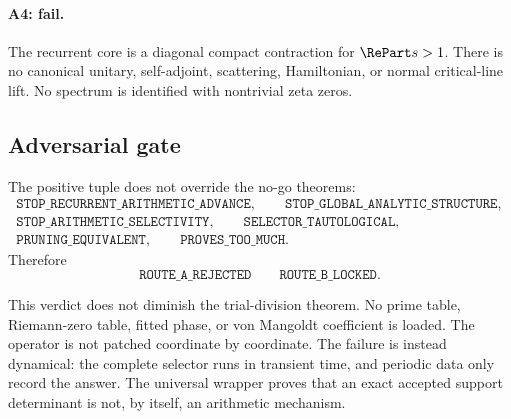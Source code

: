 \paragraph{A4: fail.}
The recurrent core is a diagonal compact contraction for $\RePart s>1$.
There is no canonical unitary, self-adjoint, scattering, Hamiltonian, or
normal critical-line lift.  No spectrum is identified with nontrivial zeta
zeros.

\subsection{Adversarial gate}

The positive tuple does not override the no-go theorems:
\[
\begin{gathered}
\texttt{STOP\_RECURRENT\_ARITHMETIC\_ADVANCE},\qquad
\texttt{STOP\_GLOBAL\_ANALYTIC\_STRUCTURE},\\
\texttt{STOP\_ARITHMETIC\_SELECTIVITY},\qquad
\texttt{SELECTOR\_TAUTOLOGICAL},\\
\texttt{PRUNING\_EQUIVALENT},\qquad
\texttt{PROVES\_TOO\_MUCH}.
\end{gathered}
\]
Therefore
\[
\boxed{\texttt{ROUTE\_A\_REJECTED}\qquad
\texttt{ROUTE\_B\_LOCKED}.}
\]

This verdict does not diminish the trial-division theorem.  No prime table,
Riemann-zero table, fitted phase, or von Mangoldt coefficient is loaded.  The
operator is not patched coordinate by coordinate.  The failure is instead
dynamical: the complete selector runs in transient time, and periodic data
only record the answer.  The universal wrapper proves that an exact accepted
support determinant is not, by itself, an arithmetic mechanism.
